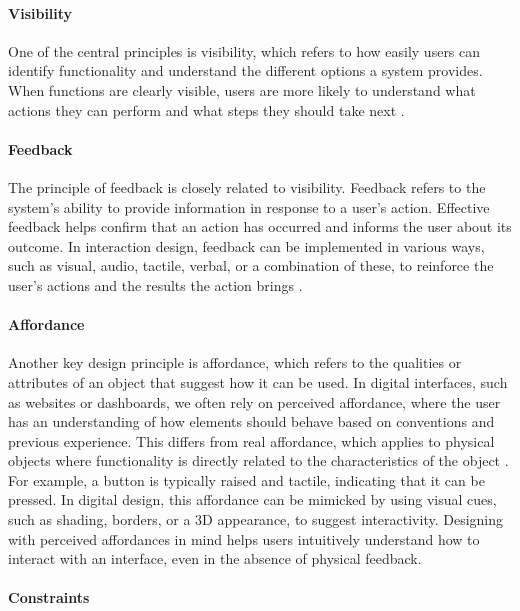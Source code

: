 \paragraph{Visibility}
\label{par:visibility}


One of the central principles is visibility, which refers to how easily users can identify functionality and understand the different options a system provides. When functions are clearly visible, users are more likely to understand what actions they can perform and what steps they should take next \autocite[p. 26]{sharp-2019}.

\paragraph{Feedback}
\label{par:feedback}


The principle of feedback is closely related to visibility. Feedback refers to the system’s ability to provide information in response to a user's action. Effective feedback helps confirm that an action has occurred and informs the user about its outcome. In interaction design, feedback can be implemented in various ways, such as visual, audio, tactile, verbal, or a combination of these, to reinforce the user’s actions and the results the action brings \autocite[p. 27-28]{sharp-2019}.

\paragraph{Affordance}
\label{par:affordance}


Another key design principle is affordance, which refers to the qualities or attributes of an object that suggest how it can be used. In digital interfaces, such as websites or dashboards, we often rely on perceived affordance, where the user has an understanding of how elements should behave based on conventions and previous experience. This differs from real affordance, which applies to physical objects where functionality is directly related to the characteristics of the object \autocite[p. 29]{sharp-2019}. For example, a button is typically raised and tactile, indicating that it can be pressed. In digital design, this affordance can be mimicked by using visual cues, such as shading, borders, or a 3D appearance, to suggest interactivity. Designing with perceived affordances in mind helps users intuitively understand how to interact with an interface, even in the absence of physical feedback.

\paragraph{Constraints}
\label{par:constraints}


